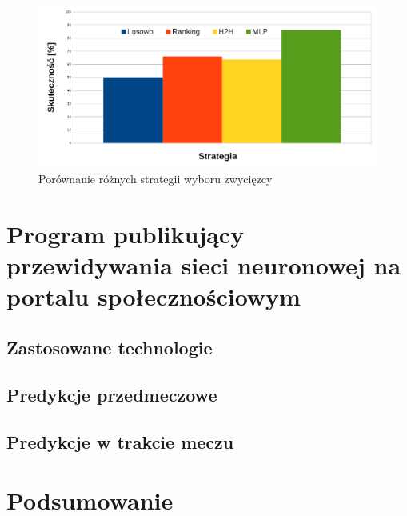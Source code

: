 \begin{figure}[H]
\includegraphics[width=\textwidth]{scores.png}
\caption{Porównanie różnych strategii wyboru zwycięzcy}
\label{fig:scores}
\end{figure}



\chapter{Program publikujący przewidywania sieci neuronowej na portalu społecznościowym}

\section{Zastosowane technologie}
\label{Sec:BotTech}

\section{Predykcje przedmeczowe}
\label{Sec:PredykcjePrzed}

\section{Predykcje w trakcie meczu}
\label{Sec:PredykcjeLive}

\chapter{Podsumowanie}




\listoffigures
\listoftables

